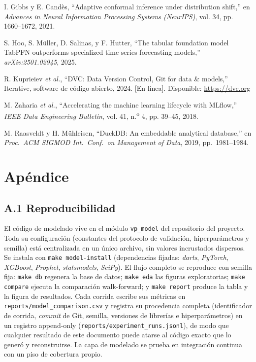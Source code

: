 \documentclass[12pt,letterpaper]{report}
\begin{document}
\begin{enumerate}[label={[\arabic*]}, leftmargin=*, itemsep=2pt]
\item\label{bib:55} I. Gibbs y E. Cand\`es, ``Adaptive conformal inference under
distribution shift,'' en \textit{Advances in Neural Information Processing Systems
(NeurIPS)}, vol. 34, pp. 1660--1672, 2021.
\item\label{bib:56} S. Hoo, S. M\"uller, D. Salinas, y F. Hutter, ``The tabular
foundation model TabPFN outperforms specialized time series forecasting models,''
\textit{arXiv:2501.02945}, 2025.
\item\label{bib:57} R. Kuprieiev \textit{et al.}, ``DVC: Data Version Control, Git
for data \& models,'' Iterative, software de c\'odigo abierto, 2024. [En l\'inea]. Disponible: \url{https://dvc.org}
\item\label{bib:58} M. Zaharia \textit{et al.}, ``Accelerating the machine learning
lifecycle with MLflow,'' \textit{IEEE Data Engineering Bulletin}, vol. 41, n.\textsuperscript{o} 4,
pp. 39--45, 2018.
\item\label{bib:59} M. Raasveldt y H. M\"uhleisen, ``DuckDB: An embeddable analytical
database,'' en \textit{Proc.\ ACM SIGMOD Int.\ Conf.\ on Management of Data}, 2019, pp.\ 1981--1984.
\end{enumerate}

\appendix
\chapter{Apéndice}

\section{A.1 Reproducibilidad}

El código de modelado vive en el módulo \texttt{vp\_model} del repositorio del
proyecto. Toda su configuración (constantes del protocolo de validación,
hiperparámetros y semilla) está centralizada en un único archivo, sin valores
incrustados dispersos. Se instala con \texttt{make model-install} (dependencias
fijadas: \textit{darts}, \textit{PyTorch}, \textit{XGBoost}, \textit{Prophet},
\textit{statsmodels}, \textit{SciPy}). El flujo completo se reproduce con semilla
fija: \texttt{make db} regenera la base de datos; \texttt{make eda} las figuras
exploratorias; \texttt{make compare} ejecuta la comparación walk-forward; y
\texttt{make report} produce la tabla y la figura de resultados. Cada corrida
escribe sus métricas en \texttt{reports/model\_comparison.csv} y registra su
procedencia completa (identificador de corrida, \textit{commit} de Git, semilla,
versiones de librerías e hiperparámetros) en un registro append-only
(\texttt{reports/experiment\_runs.jsonl}), de modo que cualquier resultado de este
documento puede atarse al código exacto que lo generó y reconstruirse. La capa de
modelado se prueba en integración continua con un piso de cobertura propio.
\end{document}
